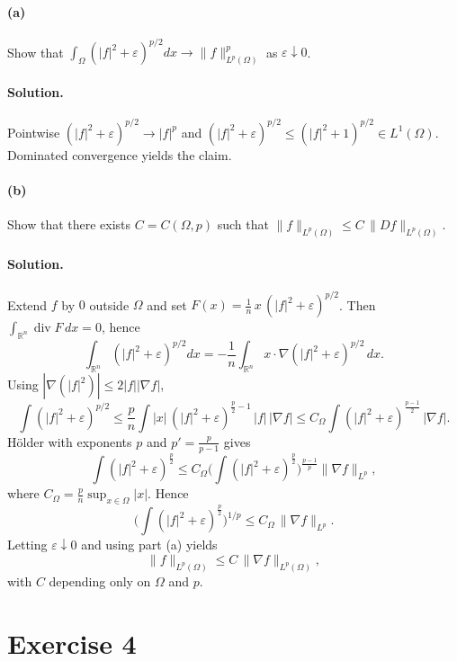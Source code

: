 \documentclass[12pt,a4paper]{article}
\theoremstyle{plain}
\theoremstyle{definition}
\theoremstyle{remark}
\theoremstyle{remark}
\begin{document}
\paragraph{(a)} Show that $\displaystyle \int_\Omega (|f|^2+\varepsilon)^{p/2}dx \to \|f\|_{L^p(\Omega)}^p$ as $\varepsilon\downarrow0$.

\paragraph{Solution.}
Pointwise $(|f|^2+\varepsilon)^{p/2}\to |f|^p$ and
$(|f|^2+\varepsilon)^{p/2}\le (|f|^2+1)^{p/2}\in L^1(\Omega)$.
Dominated convergence yields the claim.

\medskip

\paragraph{(b)} Show that there exists $C=C(\Omega,p)$ such that $\|f\|_{L^p(\Omega)}\le C\,\|Df\|_{L^p(\Omega)}$.

\paragraph{Solution.}
Extend $f$ by $0$ outside $\Omega$ and set $F(x)=\tfrac{1}{n}\,x\,(|f|^2+\varepsilon)^{p/2}$.
Then $\int_{\mathbb R^n}\!\operatorname{div}F\,dx=0$, hence
\[
\int_{\mathbb R^n} (|f|^2+\varepsilon)^{p/2} dx
= -\frac{1}{n}\int_{\mathbb R^n} x\cdot \nabla (|f|^2+\varepsilon)^{p/2}\,dx.
\]
Using $|\nabla(|f|^2)|\le 2|f||\nabla f|$,
\[
\int (|f|^2+\varepsilon)^{p/2}
\le \frac{p}{n}\!\int |x|\, (|f|^2+\varepsilon)^{\frac{p}{2}-1}\,|f|\,|\nabla f|
\le C_\Omega \!\int (|f|^2+\varepsilon)^{\frac{p-1}{2}}\,|\nabla f|.
\]
H\"older with exponents $p$ and $p'=\frac{p}{p-1}$ gives
\[
\int (|f|^2+\varepsilon)^{\frac{p}{2}}
\le C_\Omega \Big(\int (|f|^2+\varepsilon)^{\frac{p}{2}}\Big)^{\!\frac{p-1}{p}}
\|\nabla f\|_{L^p},
\]
where $C_\Omega=\tfrac{p}{n}\sup_{x\in\Omega}|x|$.
Hence
\[
\Big(\int (|f|^2+\varepsilon)^{\frac{p}{2}}\Big)^{1/p} \le C_\Omega\,\|\nabla f\|_{L^p}.
\]
Letting $\varepsilon\downarrow0$ and using part (a) yields
\[
\|f\|_{L^p(\Omega)} \le C\,\|\nabla f\|_{L^p(\Omega)},
\]
with $C$ depending only on $\Omega$ and $p$.

\section*{Exercise 4}
\end{document}
